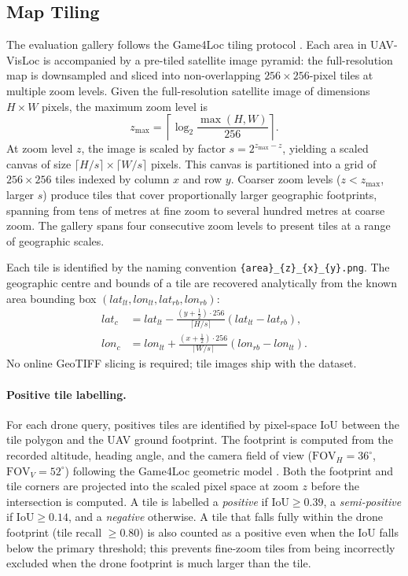 \documentclass[conference]{IEEEtran}
\begin{document}
\subsection{Map Tiling}
\label{sec:eval}
The evaluation gallery follows the Game4Loc tiling protocol
\cite{ji2024game4loc}.
Each area in UAV-VisLoc is accompanied by a pre-tiled satellite image pyramid:
the full-resolution map is downsampled and sliced into non-overlapping
$256\times256$-pixel tiles at multiple zoom levels.
Given the full-resolution satellite image of dimensions $H\times W$ pixels,
the maximum zoom level is
\begin{equation}
    z_{\max} = \left\lceil \log_2 \frac{\max(H,W)}{256} \right\rceil.
\end{equation}
At zoom level $z$, the image is scaled by factor $s = 2^{z_{\max}-z}$,
yielding a scaled canvas of size
$\lceil H/s \rceil \times \lceil W/s \rceil$ pixels.
This canvas is partitioned into a grid of $256\times 256$ tiles indexed by
column $x$ and row $y$.
Coarser zoom levels ($z < z_{\max}$, larger $s$) produce tiles that cover
proportionally larger geographic footprints, spanning from tens of metres at
fine zoom to several hundred metres at coarse zoom.
The gallery spans four consecutive zoom levels to present tiles at a range
of geographic scales.

Each tile is identified by the naming convention
\texttt{\{area\}\_\{z\}\_\{x\}\_\{y\}.png}.
The geographic centre and bounds of a tile are recovered analytically from
the known area bounding box $(lat_{lt}, lon_{lt}, lat_{rb}, lon_{rb})$:
\begin{equation}
\begin{split}
    lat_c &= lat_{lt} -
        \frac{(y+\tfrac{1}{2})\cdot 256}{\lceil H/s \rceil}
        (lat_{lt} - lat_{rb}),\\
    lon_c &= lon_{lt} +
        \frac{(x+\tfrac{1}{2})\cdot 256}{\lceil W/s \rceil}
        (lon_{rb} - lon_{lt}).
\end{split}
\end{equation}
No online GeoTIFF slicing is required; tile images ship with the dataset.

\paragraph{Positive tile labelling.}
For each drone query, positives tiles are identified by pixel-space IoU
between the tile polygon and the UAV ground footprint.
The footprint is computed from the recorded altitude, heading angle, and
the camera field of view ($\mathrm{FOV}_H=36^\circ$, $\mathrm{FOV}_V=52^\circ$)
following the Game4Loc geometric model \cite{ji2024game4loc}.
Both the footprint and tile corners are projected into the scaled pixel space
at zoom $z$ before the intersection is computed.
A tile is labelled a \emph{positive} if $\mathrm{IoU} \geq 0.39$, a
\emph{semi-positive} if $\mathrm{IoU} \geq 0.14$, and a \emph{negative}
otherwise. A tile that falls fully within the drone footprint
(tile recall $\geq 0.80$) is also counted as a positive even when the
IoU falls below the primary threshold; this prevents fine-zoom tiles
from being incorrectly excluded when the drone footprint is much larger
than the tile.
\end{document}
